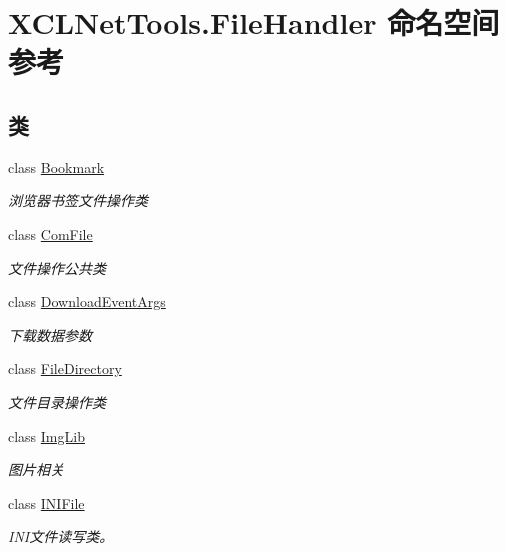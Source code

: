 \hypertarget{namespace_x_c_l_net_tools_1_1_file_handler}{}\section{X\+C\+L\+Net\+Tools.\+File\+Handler 命名空间参考}
\label{namespace_x_c_l_net_tools_1_1_file_handler}
\subsection*{类}
\begin{DoxyCompactItemize}
\item 
class \hyperlink{class_x_c_l_net_tools_1_1_file_handler_1_1_bookmark}{Bookmark}
\begin{DoxyCompactList}\small\item\em 浏览器书签文件操作类 \end{DoxyCompactList}\item 
class \hyperlink{class_x_c_l_net_tools_1_1_file_handler_1_1_com_file}{Com\+File}
\begin{DoxyCompactList}\small\item\em 文件操作公共类 \end{DoxyCompactList}\item 
class \hyperlink{class_x_c_l_net_tools_1_1_file_handler_1_1_download_event_args}{Download\+Event\+Args}
\begin{DoxyCompactList}\small\item\em 下载数据参数 \end{DoxyCompactList}\item 
class \hyperlink{class_x_c_l_net_tools_1_1_file_handler_1_1_file_directory}{File\+Directory}
\begin{DoxyCompactList}\small\item\em 文件目录操作类 \end{DoxyCompactList}\item 
class \hyperlink{class_x_c_l_net_tools_1_1_file_handler_1_1_img_lib}{Img\+Lib}
\begin{DoxyCompactList}\small\item\em 图片相关 \end{DoxyCompactList}\item 
class \hyperlink{class_x_c_l_net_tools_1_1_file_handler_1_1_i_n_i_file}{I\+N\+I\+File}
\begin{DoxyCompactList}\small\item\em I\+N\+I文件读写类。 \end{DoxyCompactList}\item 

\end{DoxyCompactItemize}
